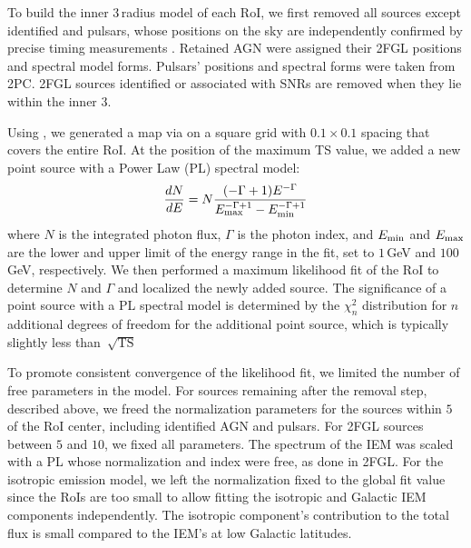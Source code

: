 To build the inner $3$\degr{}\,radius model of each RoI, we first removed all sources except identified \agn{} and pulsars, whose positions on the sky are independently confirmed by precise timing measurements \citep{2PC}. Retained AGN were assigned their 2FGL positions and spectral model forms. Pulsars' positions and spectral forms were taken from 2PC. 2FGL sources identified or associated with SNRs are removed when they lie within the inner $3$\degr{}. 

Using \srcs{}, we generated a \ts{} map via \ptlike{} on a square grid with $0.1$\degr{}\,$\times$\,$0.1$\degr{} spacing that covers the entire RoI. At the position of the maximum TS value, we added a new point source with a Power Law (PL) spectral model:
\begin{equation}
\label{eqn:PL}
\frac{dN}{dE} = N\frac{(-\Gamma+1)E^{-\Gamma}} {E_{\rm max}^{-\Gamma+1} - E_{\rm min}^{-\Gamma+1}}
\end{equation}
where $N$ is the integrated photon flux, $\Gamma$ is the photon index, and $E_{\rm min}$ and $E_{\rm max}$ are the lower and upper limit of the energy range in the fit, set to $1$\,GeV and $100$\,GeV, respectively.
We then performed a maximum likelihood fit of the RoI to determine $N$ and $\Gamma$ and localized the newly added source. 
The significance of a point source with a PL spectral model is determined by the $\chi^2_n$ distribution for $n$ additional degrees of freedom for the additional point source, which is typically slightly less than~$\sqrt{\textrm{TS}}$

To promote consistent convergence of the likelihood fit, we limited the number of free parameters in the model. For sources remaining after the removal step, described above, we freed the normalization parameters for the sources within $5$\degr{} of the RoI center, including identified AGN and pulsars. For 2FGL sources between $5$\degr{} and $10$\degr{}, we fixed all parameters. The spectrum of the IEM was scaled with a PL whose normalization and index were free, as done in 2FGL. For the isotropic emission model, we left the normalization fixed to the global fit value since the RoIs are too small to allow fitting the isotropic and Galactic IEM components independently. The isotropic component's contribution to the total flux is small compared to the IEM's at low Galactic latitudes.

